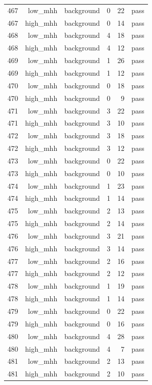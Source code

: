 \begin{table}[htbp]
{\begin{tabular}{lrrrrr}
467 & low\_mhh & background & 0 & 22 & pass \\
467 & high\_mhh & background & 0 & 14 & pass \\
468 & low\_mhh & background & 4 & 18 & pass \\
468 & high\_mhh & background & 4 & 12 & pass \\
469 & low\_mhh & background & 1 & 26 & pass \\
469 & high\_mhh & background & 1 & 12 & pass \\
470 & low\_mhh & background & 0 & 18 & pass \\
470 & high\_mhh & background & 0 & 9 & pass \\
471 & low\_mhh & background & 3 & 22 & pass \\
471 & high\_mhh & background & 3 & 10 & pass \\
472 & low\_mhh & background & 3 & 18 & pass \\
472 & high\_mhh & background & 3 & 12 & pass \\
473 & low\_mhh & background & 0 & 22 & pass \\
473 & high\_mhh & background & 0 & 10 & pass \\
474 & low\_mhh & background & 1 & 23 & pass \\
474 & high\_mhh & background & 1 & 14 & pass \\
475 & low\_mhh & background & 2 & 13 & pass \\
475 & high\_mhh & background & 2 & 14 & pass \\
476 & low\_mhh & background & 3 & 21 & pass \\
476 & high\_mhh & background & 3 & 14 & pass \\
477 & low\_mhh & background & 2 & 16 & pass \\
477 & high\_mhh & background & 2 & 12 & pass \\
478 & low\_mhh & background & 1 & 19 & pass \\
478 & high\_mhh & background & 1 & 14 & pass \\
479 & low\_mhh & background & 0 & 22 & pass \\
479 & high\_mhh & background & 0 & 16 & pass \\
480 & low\_mhh & background & 4 & 28 & pass \\
480 & high\_mhh & background & 4 & 7 & pass \\
481 & low\_mhh & background & 2 & 13 & pass \\
481 & high\_mhh & background & 2 & 10 & pass \\

\end{tabular}}
\end{table}

